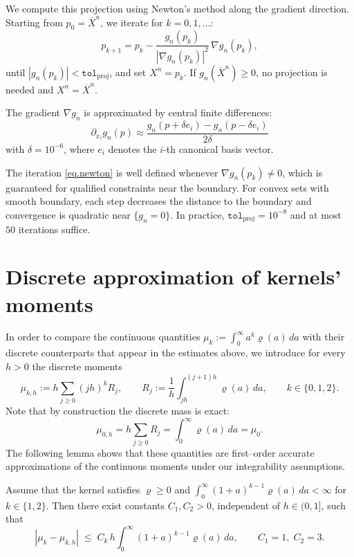 \documentclass[]{jnsao}
\begin{document}
We compute this projection using Newton's method along the gradient direction.
Starting from $p_0 = \overline{X}^n$, we iterate for $k = 0, 1, \ldots$:
\begin{equation}\label{eq.newton}
	p_{k+1} = p_k - \frac{g_n(p_k)}{|\nabla g_n(p_k)|^2}\, \nabla g_n(p_k),
\end{equation}
until $|g_n(p_k)| < \texttt{tol}_{\text{proj}}$,
and set $X^n = p_k$.
If $g_n(\overline{X}^n) \geq 0$, no projection is needed and $X^n = \overline{X}^n$.

The gradient $\nabla g_n$ is approximated by central finite differences:
$$
\partial_{x_i} g_n(p) \approx \frac{g_n(p + \delta e_i) - g_n(p - \delta e_i)}{2\delta}
$$
with $\delta = 10^{-6}$, where $e_i$ denotes the $i$-th canonical basis vector.

\begin{remark}
	The iteration \eqref{eq.newton} is well defined whenever
	$\nabla g_n(p_k) \neq 0$, which is guaranteed for qualified constraints
	near the boundary.
	For convex sets with smooth boundary, each step decreases the distance
	to the boundary and convergence is quadratic near $\{g_n = 0\}$.
	In practice,
	$\texttt{tol}_{\text{proj}} = 10^{-8}$
	and at most $50$ iterations suffice.
\end{remark}


\appendix


	 \section{Discrete approximation of kernels' moments}\label{sec:moments}
	
	In order to compare the continuous quantities 
	\(\mu_k:= \int_0^{\infty} a^k \varrho(a)\,da\) 
	with their discrete counterparts that appear in the estimates above,
	we introduce for every \(h>0\) the discrete moments
	\[
	\mu_{k,h}:= h \sum_{j\ge0} (jh)^k R_j,
	\qquad 
	R_j:= \frac{1}{h}\int_{jh}^{(j+1)h}\varrho(a)\,da,
	\qquad k\in\{0,1,2\}.
	\]
	Note that by construction the discrete mass is exact:
	\[
	\mu_{0,h}=h\sum_{j\ge0}R_j=\int_0^\infty\varrho(a)\,da=\mu_0.
	\]
	The following lemma shows that these quantities are first–order accurate
	approximations of the continuous moments under our integrability assumptions.
	
	\begin{lemma}
		\label{lem:moments}
		Assume that the kernel satisfies \(\varrho\ge0\) and 
		\(\int_0^{\infty}(1+a)^{k-1}\varrho(a)\,da<\infty\) 
		for \(k\in\{1,2\}\). Then there exist constants \(C_1,C_2>0\),
		independent of \(h\in(0,1]\), such that
		\begin{equation}\label{eq:moment_error}
			|\mu_k-\mu_{k,h}|
			\;\le\;
			C_k\,h
			\int_0^{\infty}(1+a)^{k-1}\varrho(a)\,da,
			\qquad
			C_1=1,\; C_2=3.
		\end{equation}
	\end{lemma}
	
\end{document}
